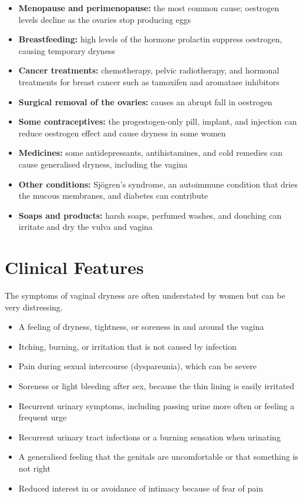 \begin{itemize}
    \item \textbf{Menopause and perimenopause:} the most common cause; oestrogen levels decline as the ovaries stop producing eggs
    \item \textbf{Breastfeeding:} high levels of the hormone prolactin suppress oestrogen, causing temporary dryness
    \item \textbf{Cancer treatments:} chemotherapy, pelvic radiotherapy, and hormonal treatments for breast cancer such as tamoxifen and aromatase inhibitors
    \item \textbf{Surgical removal of the ovaries:} causes an abrupt fall in oestrogen
    \item \textbf{Some contraceptives:} the progestogen-only pill, implant, and injection can reduce oestrogen effect and cause dryness in some women
    \item \textbf{Medicines:} some antidepressants, antihistamines, and cold remedies can cause generalised dryness, including the vagina
    \item \textbf{Other conditions:} Sjögren's syndrome, an autoimmune condition that dries the mucous membranes, and diabetes can contribute
    \item \textbf{Soaps and products:} harsh soaps, perfumed washes, and douching can irritate and dry the vulva and vagina
\end{itemize}

\section*{Clinical Features}
The symptoms of vaginal dryness are often understated by women but can be very distressing.

\begin{itemize}
    \item A feeling of dryness, tightness, or soreness in and around the vagina
    \item Itching, burning, or irritation that is not caused by infection
    \item Pain during sexual intercourse (dyspareunia), which can be severe
    \item Soreness or light bleeding after sex, because the thin lining is easily irritated
    \item Recurrent urinary symptoms, including passing urine more often or feeling a frequent urge
    \item Recurrent urinary tract infections or a burning sensation when urinating
    \item A generalised feeling that the genitals are uncomfortable or that something is not right
    \item Reduced interest in or avoidance of intimacy because of fear of pain
\end{itemize}


